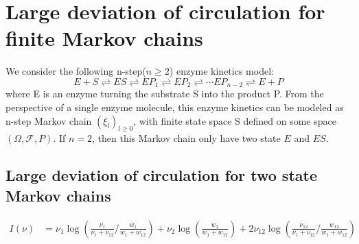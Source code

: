 \documentclass[11pt,en,cite=authoryear]{elegantpaper}
\begin{document}
\section{Large deviation of circulation for finite Markov chains}
We consider the following n-step($n\ge 2$) enzyme kinetics model:
$$
E + S \rightleftharpoons
ES \rightleftharpoons
EP_1 \rightleftharpoons
EP_2 \rightleftharpoons
\cdots
EP_{n-2} \rightleftharpoons
E + P
$$
where E is an enzyme turning the substrate S into the product P. From the  perspective of a single enzyme molecule, this enzyme kinetics can be modeled as n-step Markov chain $(\xi_l)_{l\ge 0}$, with finite state space S defined on some space $(\Omega, \mathcal{F}, P)$. If $n=2$, then this Markov chain only have two state $E$ and $ES$. 

\begin{theorem}
    
\end{theorem}

\subsection{Large deviation of circulation for two state Markov chains}
\begin{align*}
    I(\nu) &= \nu_{1}\log(\frac{\nu_{1}}{\nu_{1}+\nu_{12}}/\frac{w_{1}}{w_{1}+w_{12}}) + \nu_{2}\log(\frac{w_{2}}{w_{1}+w_{12}}) + 2\nu_{12} \log (\frac{\nu_{12}}{\nu_{1}+\nu_{12}}/\frac{w_{12}}{w_{1}+w_{12}})
\end{align*}
\end{document}
